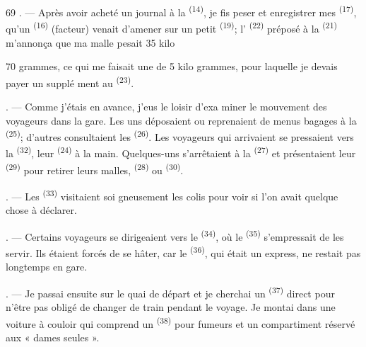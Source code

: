 \begin{VUpage}[71]{69}
. --- Après avoir acheté un journal à la \cc
{}\textsuperscript{(14)}, je fis peser et enregistrer mes \textsuperscript{(17)},\nl
qu'un  \textsuperscript{(16)} (facteur) venait d'amener sur un\nl
petit  \textsuperscript{(19)}; l' \textsuperscript{(22)} préposé à la \cc
{} \textsuperscript{(21)} m'annonça que ma malle pesait 35 kilo
\parplein
\end{VUpage}

\begin{VUpage}[72]{70}
\VUcontinue
grammes, ce qui me faisait une  de 5 kilo\cc
grammes, pour laquelle je devais payer un supplé\cc
ment au  \textsuperscript{(23)}.

. --- Comme j'étais en avance, j'eus le loisir d'exa\cc
miner le mouvement des voyageurs dans la gare. Les\nl
uns déposaient ou reprenaient de menus bagages à la\nl
{} \textsuperscript{(25)}; d'autres consultaient les  \textsuperscript{(26)}.\nl
Les voyageurs qui arrivaient se pressaient vers la\nl
{} \textsuperscript{(32)}, leur  \textsuperscript{(24)} à la main. Quelques-uns\nl
s'arrêtaient à la  \textsuperscript{(27)}\nl
et présentaient leur \textsuperscript{(29)} pour retirer leurs\nl
malles, \textsuperscript{(28)} ou \textsuperscript{(30)}.

. --- Les \textsuperscript{(33)} visitaient soi\cc
gneusement les colis pour voir si l'on avait quelque\nl
chose à déclarer.

. --- Certains voyageurs se dirigeaient vers le \cc
{}\textsuperscript{(34)}, où le \textsuperscript{(35)} s'empressait de les servir.\nl
Ils étaient forcés de se hâter, car le \textsuperscript{(36)}, qui\nl
était un express, ne restait pas longtemps en gare.

. --- Je passai ensuite sur le quai de départ et je\nl
cherchai un \textsuperscript{(37)} direct pour n'être pas obligé de\nl
changer de train pendant le voyage. Je montai dans\nl
une voiture à couloir qui comprend un \cc
{}\textsuperscript{(38)} pour fumeurs et un compartiment réservé\nl
aux « dames seules ».


\end{VUpage}
